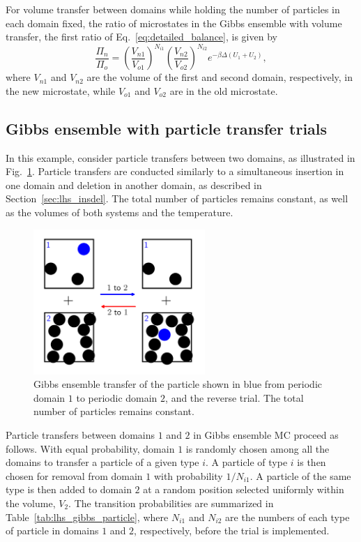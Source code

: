 \documentclass[
  9pt,
  bestpractices,
]{livecoms}
\begin{document}
For volume transfer between domains while holding the number of particles in each domain fixed, the ratio of microstates in the Gibbs ensemble with volume transfer, the first ratio of Eq.~\ref{eq:detailed_balance}, is given by
\begin{equation}
\frac{\Pi_{n}}{\Pi_{o}} = \left(\frac{V_{n1}}{V_{o1}}\right)^{N_{i1}}\left(\frac{V_{n2}}{V_{o2}}\right)^{N_{i2}}e^{-\beta\Delta (U_1+U_2)},
\label{eq:rhs_gibbs_volume}
\end{equation}
where $V_{n1}$ and $V_{n2}$ are the volume of the first and second domain, respectively, in the new microstate, while $V_{o1}$ and $V_{o2}$ are in the old microstate.

\subsection{\label{sec:lhs_gibbs_particle}Gibbs ensemble with particle transfer trials}

In this example, consider particle transfers between two domains, as illustrated in Fig.~\ref{fig:gibbs_particle}.
Particle transfers are conducted similarly to a simultaneous insertion in one domain and deletion in another domain, as described in Section~\ref{sec:lhs_insdel}.
The total number of particles remains constant, as well as the volumes of both systems and the temperature.

\begin{figure}
\includegraphics[width=6.5cm]{../figures/gibbs_particle.png}
\caption{
Gibbs ensemble transfer of the particle shown in blue from periodic domain $1$ to periodic domain $2$, and the reverse trial.
The total number of particles remains constant.
}
\label{fig:gibbs_particle}
\end{figure}

Particle transfers between domains $1$ and $2$ in Gibbs ensemble MC proceed as follows.
With equal probability, domain $1$ is randomly chosen among all the domains to transfer a particle of a given type $i$.
A particle of type $i$ is then chosen for removal from domain $1$ with probability $1/N_{i1}$.
A particle of the same type is then added to domain $2$ at a random position selected uniformly within the volume, $V_2$.
The transition probabilities are summarized in Table~\ref{tab:lhs_gibbs_particle}, where $N_{i1}$ and $N_{i2}$ are the numbers of each type of particle in domains $1$ and $2$, respectively, before the trial is implemented.
\end{document}
